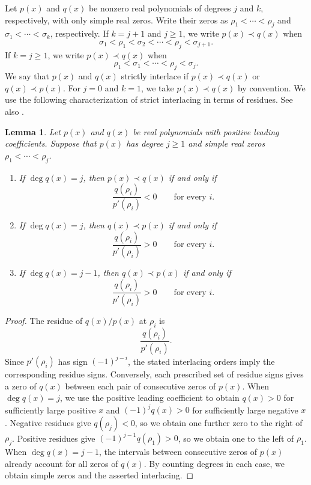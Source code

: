 \documentclass[10pt,a4paper]{article}
\numberwithin{equation}{section}
\newtheorem{lemma}[theorem]{Lemma}
\theoremstyle{remark}\newtheorem{remark}[theorem]{Remark}
\begin{document}
Let $p(x)$ and $q(x)$ be nonzero real polynomials of degrees $j$ and $k$,
respectively, with only simple real zeros. Write their zeros as
$\rho_1<\cdots<\rho_j$ and $\sigma_1<\cdots<\sigma_k$, respectively.
If $k=j+1$ and $j\ge1$, we write $p(x)\prec q(x)$ when
\[
 \sigma_1<\rho_1<\sigma_2<\cdots<\rho_j<\sigma_{j+1}.
\]
If $k=j\ge1$, we write $p(x)\prec q(x)$ when
\[
 \rho_1<\sigma_1<\cdots<\rho_j<\sigma_j.
\]
We say that $p(x)$ and $q(x)$ strictly interlace if
$p(x)\prec q(x)$ or $q(x)\prec p(x)$.
For $j=0$ and $k=1$, we take $p(x)\prec q(x)$ by convention.
We use the following characterization of strict interlacing in terms
of residues. See also \cite{HT}.

\begin{lemma}\label{c:lem:residue}
Let $p(x)$ and $q(x)$ be real polynomials with positive leading
coefficients. Suppose that $p(x)$ has degree $j\ge1$ and simple real
zeros $\rho_1<\cdots<\rho_j$.
\begin{enumerate}
\item[(i)] If $\deg q(x)=j$, then $p(x)\prec q(x)$ if and only if
\[
 \frac{q(\rho_i)}{p'(\rho_i)}<0\qquad\text{for every }i.
\]
\item[(ii)] If $\deg q(x)=j$, then $q(x)\prec p(x)$ if and only if
\[
 \frac{q(\rho_i)}{p'(\rho_i)}>0\qquad\text{for every }i.
\]
\item[(iii)] If $\deg q(x)=j-1$, then $q(x)\prec p(x)$ if and only if
\[
 \frac{q(\rho_i)}{p'(\rho_i)}>0\qquad\text{for every }i.
\]
\end{enumerate}
\end{lemma}
\begin{proof}
The residue of $q(x)/p(x)$ at $\rho_i$ is
\[
 \frac{q(\rho_i)}{p'(\rho_i)}.
\]
Since $p'(\rho_i)$ has sign $(-1)^{j-i}$, the stated interlacing
orders imply the corresponding residue signs.
Conversely, each prescribed set of residue signs gives a zero of
$q(x)$ between each pair of consecutive zeros of $p(x)$.
When $\deg q(x)=j$, we use the positive leading coefficient to obtain
$q(x)>0$ for sufficiently large positive $x$ and
$(-1)^j q(x)>0$ for sufficiently large negative $x$.
Negative residues give $q(\rho_j)<0$, so we obtain one further
zero to the right of $\rho_j$. Positive residues give
$(-1)^{j-1}q(\rho_1)>0$, so we obtain one to the left of $\rho_1$.
When $\deg q(x)=j-1$, the intervals between consecutive zeros of
$p(x)$ already account for all zeros of $q(x)$. By counting degrees in each
case, we obtain simple zeros and the asserted interlacing.
\end{proof}
\end{document}
